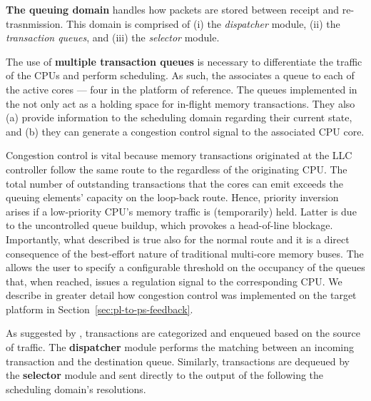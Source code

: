 
\par{\bf The queuing domain} handles how packets are stored between
receipt and re-trasnmission. This domain is comprised of (i) the
\emph{dispatcher} module, (ii) the \emph{transaction queues}, and
(iii) the \emph{selector} module.

The use of {\bf multiple transaction queues} is necessary to
differentiate the traffic of the CPUs and perform scheduling. As such,
the \schim associates a queue to each of the active cores --- four in
the platform of reference.
The queues implemented in the \schim not only act as a holding space
for in-flight memory transactions.  They also (a) provide information
to the scheduling domain regarding their current state, and (b) they
can generate a congestion control signal to the associated CPU
core.

Congestion control is vital because memory transactions originated
at the LLC controller follow the same route to the \schim regardless
of the originating CPU.
The total number of outstanding
transactions that the cores can emit exceeds the queuing elements' capacity on the loop-back route.
Hence, priority inversion arises if a low-priority CPU's memory traffic is (temporarily) held. Latter is due to the uncontrolled queue buildup, which provokes a head-of-line blockage. Importantly, what described is true also for the normal
route and it is a direct consequence of the best-effort nature of
traditional multi-core memory buses. The \schim allows the user to
specify a configurable threshold on the occupancy of the queues that,
when reached, issues a regulation signal to the corresponding CPU. We
describe in greater detail how congestion control was implemented on
the target platform in Section~\ref{sec:pl-to-ps-feedback}.

As suggested by , transactions are
categorized and enqueued based on the source of traffic. The {\bf
  dispatcher} module performs the matching between an incoming
transaction and the destination queue. Similarly, transactions are
dequeued by the {\bf selector} module and sent directly to the output
of the \schim following the scheduling domain's resolutions.

